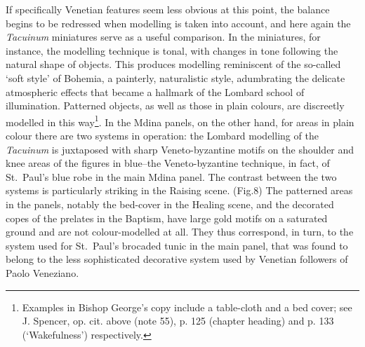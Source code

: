 \documentclass[a4paper,12pt]{article}
\begin{document}
If specifically Venetian features seem less obvious at this point, the
balance begins to be redressed when modelling is taken into account,
and here again the \textit{Tacuinum} miniatures serve as a useful
comparison. In the miniatures, for instance, the modelling technique
is tonal, with changes in tone following the natural shape of objects.
This produces modelling reminiscent of the so-called `soft style' of
Bohemia, a painterly, naturalistic style, adumbrating the delicate
atmospheric effects that became a hallmark of the Lombard school of
illumination.  Patterned objects, as well as those in plain colours,
are discreetly modelled in this way\footnote{Examples in Bishop
George's copy include a table-cloth and a bed cover; see J. Spencer,
op. cit. above (note 55), p. 125 (chapter heading) and p. 133
(`Wakefulness') respectively.}. In the Mdina panels, on the other
hand, for areas in plain colour there are two systems in operation:
the Lombard modelling of the \textit{Tacuinum } is juxtaposed with
sharp Veneto-byzantine motifs on the shoulder and knee areas of the
figures in blue--the Veneto-byzantine technique, in fact, of
St.~Paul's blue robe in the main Mdina panel. The contrast between the
two systems is particularly striking in the Raising scene. (Fig.8) The
patterned areas in the panels, notably the bed-cover in the Healing
scene, and the decorated copes of the prelates in the Baptism, have
large gold motifs on a saturated ground and are not colour-modelled at
all. They thus correspond, in turn, to the system used for St.~Paul's
brocaded tunic in the main panel, that was found to belong to the less
sophisticated decorative system used by Venetian followers of Paolo
Veneziano.
\end{document}
